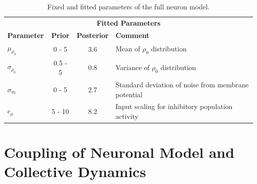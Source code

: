\documentclass[a4paper,10pt,hidelinks]{scrreprt}
\begin{document}
\begin{table} [!th]
\begin{center}
            \begin{tabular}{l|c|c|p{6.1cm}}
                \multicolumn{4}{c}{\rule{0pt}{4ex}\textbf{Fitted Parameters}}\\
                \textbf{Parameter} & \textbf{Prior} & \textbf{Posterior} & \textbf{Comment} \\
				\hline
				$\mu_{\rho_0}$ & 0 - 5 & 3.6 & Mean of $\rho_0$ distribution\\
                $\sigma_{\rho_0}$ & 0.5 - 5 & 0.8 & Variance of $\rho_0$ distribution\\
                $\sigma_{m}$ & 0 - 5 & 2.7 & Standard deviation of noise from membrane potential\\
                $c_{\rho}$ & 5 - 10 & 8.2 & Input scaling for inhibitory population activity\\
			\end{tabular}
		\end{center}
		\caption{Fixed and fitted parameters of the full neuron model.}
		\label{tab:neuroparams}
	\end{table}
	\chapter{Coupling of Neuronal Model and Collective Dynamics}
\end{document}
